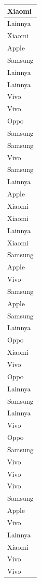 \documentclass[
  letterpaper,
  DIV=11,
  numbers=noendperiod]{scrartcl}
\begin{document}
\begin{table}
\begin{tabular}[t]{l}
\hline
Xiaomi\\
\hline
Lainnya\\
\hline
Xiaomi\\
\hline
Apple\\
\hline
Samsung\\
\hline
Lainnya\\
\hline
Lainnya\\
\hline
Vivo\\
\hline
Vivo\\
\hline
Oppo\\
\hline
Samsung\\
\hline
Samsung\\
\hline
Vivo\\
\hline
Samsung\\
\hline
Lainnya\\
\hline
Apple\\
\hline
Xiaomi\\
\hline
Xiaomi\\
\hline
Lainnya\\
\hline
Xiaomi\\
\hline
Samsung\\
\hline
Apple\\
\hline
Vivo\\
\hline
Samsung\\
\hline
Apple\\
\hline
Samsung\\
\hline
Lainnya\\
\hline
Oppo\\
\hline
Xiaomi\\
\hline
Vivo\\
\hline
Oppo\\
\hline
Lainnya\\
\hline
Samsung\\
\hline
Lainnya\\
\hline
Vivo\\
\hline
Oppo\\
\hline
Samsung\\
\hline
Vivo\\
\hline
Vivo\\
\hline
Vivo\\
\hline
Samsung\\
\hline
Apple\\
\hline
Vivo\\
\hline
Lainnya\\
\hline
Xiaomi\\
\hline
Vivo\\
\hline
Vivo\\

\end{tabular}
\end{table}
\end{document}
